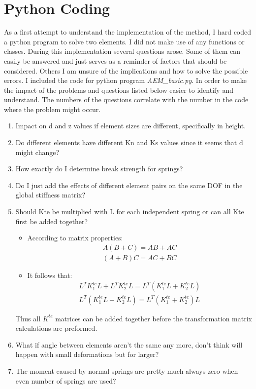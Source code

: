 \section{Python Coding}

As a first attempt to understand the implementation of the method, I hard coded a python program to solve two elements.  I did not make use of any functions or classes.  During this implementation several questions arose.  Some of them can easily be answered and just serves as a reminder of factors that should be considered.  Others I am unsure of the implications and how to solve the possible errors.  I included the code for python program \textit{AEM\_basic.py}.  In order to make the impact of the problems and questions listed below easier to identify and understand.  The numbers of the questions correlate with the number in the code where the problem might occur.

\begin{enumerate}
	\item Impact on d and z values if element sizes are different, specifically in height. 
	\item Do different elements have different Kn and Ks values since it seems that d might change?
	\item How exactly do I determine break strength for springs?
	\item Do I just add the effects of different element pairs on the same DOF in the global stiffness matrix?
	\item Should Kte be multiplied with L for each independent spring or can all Kte first be added together?
	\begin{itemize}
		\item According to matrix properties:
		\begin{eqnarray}
		A(B+C) = AB + AC \\
		(A+B)C = AC + BC
		\end{eqnarray}
		\item It follows that:
		\begin{eqnarray}
		L^TK^{te}_{1}L + L^TK^{te}_{2}L = L^T(K^{te}_{1}L + K^{te}_{2}L) \\
		L^T(K^{te}_{1}L + K^{te}_{2}L) = L^T(K^{te}_{1} + K^{te}_{2})L
		\end{eqnarray}
	\end{itemize}
		Thus all $K^{te}$ matrices can be added together before the transformation matrix calculations are preformed. 
	\item What if angle between elements aren't the same any more, don't think will happen with small deformations but for larger?
	\item The moment caused by normal springs are pretty much always zero when even number of springs are used? 
\end{enumerate}

